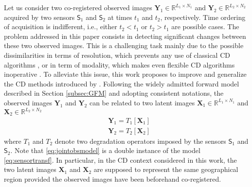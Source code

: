 \documentclass[review]{elsarticle}
\newcommand{\Ndim}{L}
\begin{document}
Let us consider two co-registered observed images $\mathbf{Y}_{1} \in \mathbb{R}^{\Ndim_{1} \times N_{1}}$ and $\mathbf{Y}_{2} \in \mathbb{R}^{\Ndim_{2} \times N_{2}}$ acquired by two sensors $\mathsf{S}_{1}$ and $\mathsf{S}_{2}$ at times $t_1$ and $t_2$, respectively. Time ordering of acquisition is indifferent, i.e., either $t_2 < t_1$ or $t_2 > t_1$ are possible cases. The problem addressed
in this paper consists in detecting significant changes between these two observed images. This is a challenging task mainly due to the possible dissimilarities in terms of resolution, which prevents any use of classical CD algorithms \citep{singh_review_1989,bovolo_time_2015}, or in term of modality, which makes even flexible CD algorithms inoperative \citep{ferraris_detecting_2017,ferraris_robust_2017}. To alleviate this issue, this work proposes to improve and generalize the CD methods introduced by \citet{seichepine_soft_2014,gong_coupled_2016,lu_joint_2017}. Following the widely admitted forward model described in Section \ref{subsec:GFM} and adopting consistent notations, the observed images $\mathbf{Y}_{1}$ and $\mathbf{Y}_{2}$ can be related to two latent images $\mathbf{X}_{1} \in \mathbb{R}^{\Ndim_{1} \times N_{1}}$ and $\mathbf{X}_{2} \in \mathbb{R}^{\Ndim_{2} \times N_{2}}$
\begin{subequations}
\label{eq:jointobsmodel}
		\begin{align}
			&\mathbf{Y}_{1} = \mathit{T}_{1}[\mathbf{X}_{1}]  \label{eq:jointobsmodel1}\\
			&\mathbf{Y}_{2} = \mathit{T}_{2}[\mathbf{X}_{2}] \label{eq:jointobsmodel2}
		\end{align}
\end{subequations}
where $\mathit{T}_{1}$ and $\mathit{T}_{2}$ denote two degradation operators imposed by the sensors $\mathsf{S}_{1}$ and $\mathsf{S}_{2}$. Note that \eqref{eq:jointobsmodel} is a double instance of the model \eqref{eq:sensortransf}. In particular, in the CD context considered in this work, the two latent images $\mathbf{X}_{1}$ and $\mathbf{X}_{2}$ are supposed to represent the same geographical region provided the observed images have been beforehand co-registered.
\end{document}
